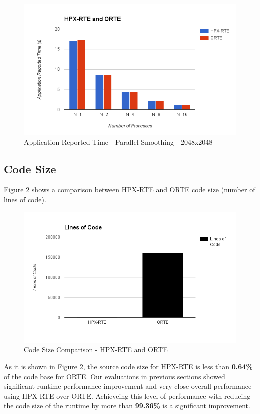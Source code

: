 \begin{figure}[h!]
  \centering
  \includegraphics[scale=0.7]{images/time-app-smoother-2048-infiniband.png}
  \caption[Application Reported Time - Parallel Smoothing - 2048x2048]{Application Reported Time - Parallel Smoothing - 2048x2048}
  \label{fig:time-app-smoother-2048-infiniband}
\end{figure}


\clearpage
\subsection{Code Size}
Figure \ref{fig:code-size} shows a comparison between HPX-RTE and ORTE code size (number of lines of code).

\begin{figure}[h!]
  \centering
  \includegraphics[scale=0.7]{images/code-size.png}
  \caption[Code Size Comparison - HPX-RTE and ORTE]{Code Size Comparison - HPX-RTE and ORTE}
  \label{fig:code-size}
\end{figure}

As it is shown in Figure \ref{fig:code-size}, the source code size for HPX-RTE is less than \textbf{0.64\%} of the code base for ORTE. Our evaluations in previous sections showed significant runtime performance improvement and very close overall performance using HPX-RTE over ORTE. Achieveing this level of performance with reducing the code size of the runtime by more than \textbf{99.36\%} is a significant improvement.

